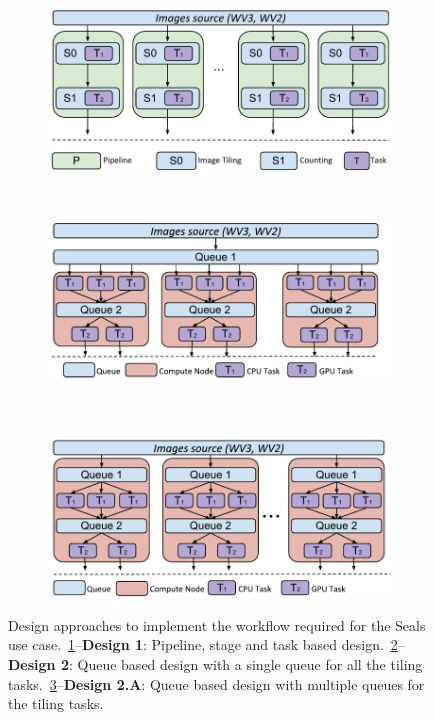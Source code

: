 \begin{figure}[ht!]
    \centering
    \begin{subfigure}[b]{0.32\textwidth}
        \includegraphics[width=\linewidth]{figures/SealsDesign1.pdf}
        \caption{}
		\label{fig:seals_design1}
    \end{subfigure}%
    ~ 
    \begin{subfigure}[b]{0.32\textwidth}
        \includegraphics[width=\linewidth]{figures/SealsDesign2.pdf}
        \caption{}\label{fig:seals_design2}
    \end{subfigure}%
    ~ 
    \begin{subfigure}[b]{0.32\textwidth}
        \includegraphics[width=\linewidth]{figures/SealsDesign3.pdf}
		\caption{}\label{fig:seals_design3}
    \end{subfigure}
    \caption{Design approaches to implement the workflow required for the
    Seals use case.~\ref{fig:seals_design1}--\textbf{Design 1}: Pipeline,
    stage and task based design.~\ref{fig:seals_design2}--\textbf{Design 2}:
    Queue based design with a single queue for all the tiling
    tasks.~\ref{fig:seals_design3}--\textbf{Design 2.A}: Queue based design
    with multiple queues for the tiling tasks.}\label{fig:designs}
\end{figure}

